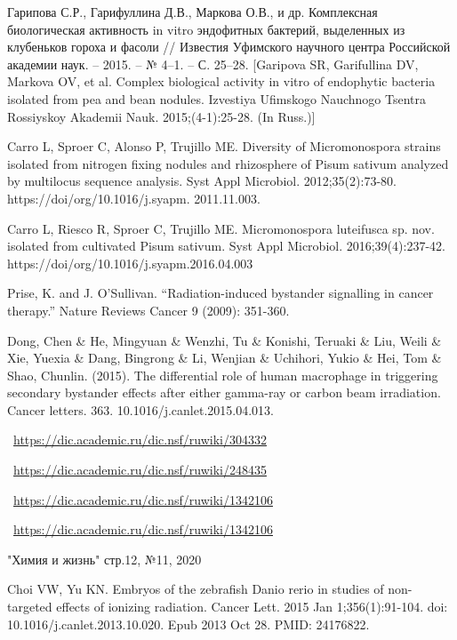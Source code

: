 \documentclass[11pt]{article}
\begin{document}
\begin{thebibliography}{3}
Гарипова С.Р., Гарифуллина Д.В., Маркова О.В.,
и др. Комплексная биологическая активность in
vitro эндофитных бактерий, выделенных из клубеньков гороха и фасоли // Известия Уфимского научного центра Российской академии наук. – 2015. –
№ 4–1. – С. 25–28. [Garipova SR, Garifullina DV,
Markova OV, et al. Complex biological activity in vitro
of endophytic bacteria isolated from pea and bean nodules.
Izvestiya Ufimskogo Nauchnogo Tsentra Rossiyskoy
Akademii Nauk. 2015;(4-1):25-28. (In Russ.)]

Carro L, Sproer C, Alonso P, Trujillo ME. Diversity of
Micromonospora strains isolated from nitrogen fixing
nodules and rhizosphere of Pisum sativum analyzed
by multilocus sequence analysis. Syst Appl Microbiol.
2012;35(2):73-80. https://doi/org/10.1016/j.syapm.
2011.11.003.

Carro L, Riesco R, Sproer C, Trujillo ME. Micromonospora luteifusca sp. nov. isolated from cultivated Pisum sativum. Syst Appl Microbiol. 2016;39(4):237-42.
https://doi/org/10.1016/j.syapm.2016.04.003

Prise, K. and J. O’Sullivan. “Radiation-induced bystander signalling in cancer therapy.” Nature Reviews Cancer 9 (2009): 351-360.

Dong, Chen \& He, Mingyuan \& Wenzhi, Tu \& Konishi, Teruaki \& Liu, Weili \& Xie, Yuexia \& Dang, Bingrong \& Li, Wenjian \& Uchihori, Yukio \& Hei, Tom \& Shao, Chunlin. (2015). The differential role of human macrophage in triggering secondary bystander effects after either gamma-ray or carbon beam irradiation. Cancer letters. 363. 10.1016/j.canlet.2015.04.013. 

~\url{https://dic.academic.ru/dic.nsf/ruwiki/304332}

~\url{https://dic.academic.ru/dic.nsf/ruwiki/248435}

~\url{https://dic.academic.ru/dic.nsf/ruwiki/1342106}

~\url{https://dic.academic.ru/dic.nsf/ruwiki/1342106}

"Химия и жизнь" стр.12, №11, 2020

Choi VW, Yu KN. Embryos of the zebrafish Danio rerio in studies of non-targeted effects of ionizing radiation. Cancer Lett. 2015 Jan 1;356(1):91-104. doi: 10.1016/j.canlet.2013.10.020. Epub 2013 Oct 28. PMID: 24176822.


\end{thebibliography}
\end{document}
